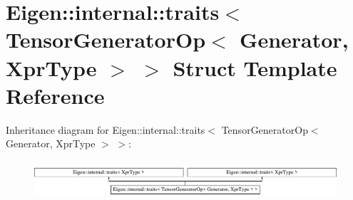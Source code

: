 \hypertarget{struct_eigen_1_1internal_1_1traits_3_01_tensor_generator_op_3_01_generator_00_01_xpr_type_01_4_01_4}{}\section{Eigen\+:\+:internal\+:\+:traits$<$ Tensor\+Generator\+Op$<$ Generator, Xpr\+Type $>$ $>$ Struct Template Reference}
\label{struct_eigen_1_1internal_1_1traits_3_01_tensor_generator_op_3_01_generator_00_01_xpr_type_01_4_01_4}
Inheritance diagram for Eigen\+:\+:internal\+:\+:traits$<$ Tensor\+Generator\+Op$<$ Generator, Xpr\+Type $>$ $>$\+:\begin{figure}[H]
\begin{center}
\leavevmode
\includegraphics[height=1.369193cm]{struct_eigen_1_1internal_1_1traits_3_01_tensor_generator_op_3_01_generator_00_01_xpr_type_01_4_01_4}
\end{center}
\end{figure}
